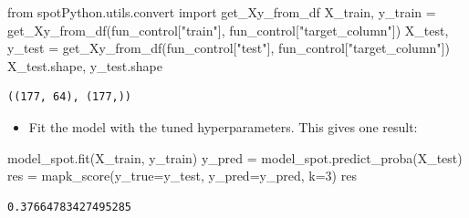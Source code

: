 \documentclass[
  letterpaper,
  DIV=11,
  numbers=noendperiod]{scrreprt}
\newenvironment{Shaded}{\begin{snugshade}}{\end{snugshade}}
\newcommand{\DecValTok}[1]{\textcolor[rgb]{0.68,0.00,0.00}{#1}}
\newcommand{\ImportTok}[1]{\textcolor[rgb]{0.00,0.46,0.62}{#1}}
\newcommand{\NormalTok}[1]{\textcolor[rgb]{0.00,0.23,0.31}{#1}}
\newcommand{\OperatorTok}[1]{\textcolor[rgb]{0.37,0.37,0.37}{#1}}
\newcommand{\StringTok}[1]{\textcolor[rgb]{0.13,0.47,0.30}{#1}}
\providecommand{\tightlist}{%
  \setlength{\itemsep}{0pt}\setlength{\parskip}{0pt}}\usepackage{longtable,booktabs,array}
\begin{document}
\begin{Shaded}
\begin{Highlighting}[]
\ImportTok{from}\NormalTok{ spotPython.utils.convert }\ImportTok{import}\NormalTok{ get\_Xy\_from\_df}
\NormalTok{X\_train, y\_train }\OperatorTok{=}\NormalTok{ get\_Xy\_from\_df(fun\_control[}\StringTok{"train"}\NormalTok{], fun\_control[}\StringTok{"target\_column"}\NormalTok{])}
\NormalTok{X\_test, y\_test }\OperatorTok{=}\NormalTok{ get\_Xy\_from\_df(fun\_control[}\StringTok{"test"}\NormalTok{], fun\_control[}\StringTok{"target\_column"}\NormalTok{])}
\NormalTok{X\_test.shape, y\_test.shape}
\end{Highlighting}
\end{Shaded}

\begin{verbatim}
((177, 64), (177,))
\end{verbatim}

\begin{itemize}
\tightlist
\item
  Fit the model with the tuned hyperparameters. This gives one result:
\end{itemize}

\begin{Shaded}
\begin{Highlighting}[]
\NormalTok{model\_spot.fit(X\_train, y\_train)}
\NormalTok{y\_pred }\OperatorTok{=}\NormalTok{ model\_spot.predict\_proba(X\_test)}
\NormalTok{res }\OperatorTok{=}\NormalTok{ mapk\_score(y\_true}\OperatorTok{=}\NormalTok{y\_test, y\_pred}\OperatorTok{=}\NormalTok{y\_pred, k}\OperatorTok{=}\DecValTok{3}\NormalTok{)}
\NormalTok{res}
\end{Highlighting}
\end{Shaded}

\begin{verbatim}
0.37664783427495285
\end{verbatim}
\end{document}
